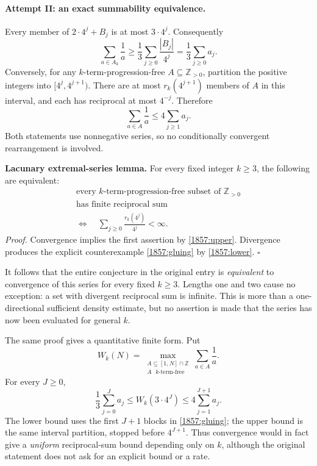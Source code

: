 \documentclass[11pt,a4paper]{article}
\newcommand{\Z}{\mathbb{Z}}
\newcommand{\A}{\mathbb{A}}
\numberwithin{equation}{section}
\begin{document}
\paragraph{Attempt II: an exact summability equivalence.}
Every member of $2\cdot4^j+B_j$ is at most $3\cdot4^j$.  Consequently
\begin{equation}\label{1857:lower}
 \sum_{a\in A_k}\frac1a
 \geq\frac13\sum_{j\geq0}\frac{|B_j|}{4^j}
 =\frac13\sum_{j\geq0}a_j.
\end{equation}
Conversely, for any $k$-term-progression-free $A\subseteq\Z_{>0}$,
partition the positive integers into $[4^j,4^{j+1})$.  There are at
most $r_k(4^{j+1})$ members of $A$ in this interval, and each has
reciprocal at most $4^{-j}$.  Therefore
\begin{equation}\label{1857:upper}
 \sum_{a\in A}\frac1a\leq4\sum_{j\geq1}a_j.
\end{equation}
Both statements use nonnegative series, so no conditionally convergent
rearrangement is involved.

\textbf{Lacunary extremal-series lemma.}
For every fixed integer $k\geq3$, the following are equivalent:
\[
 \begin{gathered}
 \text{every $k$-term-progression-free subset of $\Z_{>0}$}\\
 \text{has finite reciprocal sum}\\[2pt]
 \Longleftrightarrow\quad
 \sum_{j\geq0}\frac{r_k(4^j)}{4^j}<\infty.
 \end{gathered}
\]
\emph{Proof.} Convergence implies the first assertion by
\eqref{1857:upper}.  Divergence produces the explicit counterexample
\eqref{1857:gluing} by \eqref{1857:lower}. \hfill$\square$

It follows that the entire conjecture in the original entry is
\emph{equivalent} to convergence of this series for every fixed
$k\geq3$.  Lengths one and two cause no exception: a set with divergent
reciprocal sum is infinite.  This is more than a one-directional
sufficient density estimate, but no assertion is made that the
series has now been evaluated for general $k$.

The same proof gives a quantitative finite form.  Put
\[
 W_k(N)=\max_{\substack{A\subseteq[1,N]\cap\Z\\A\text{ $k$-term-free}}}
          \sum_{a\in A}\frac1a.
\]
For every $J\geq0$,
\begin{equation}\label{1857:finite}
 \frac13\sum_{j=0}^{J}a_j
 \leq W_k(3\cdot4^J)
 \leq4\sum_{j=1}^{J+1}a_j.
\end{equation}
The lower bound uses the first $J+1$ blocks in \eqref{1857:gluing}; the
upper bound is the same interval partition, stopped before $4^{J+1}$.
Thus convergence would in fact give a \emph{uniform} reciprocal-sum
bound depending only on $k$, although the original statement does not
ask for an explicit bound or a rate.
\end{document}
